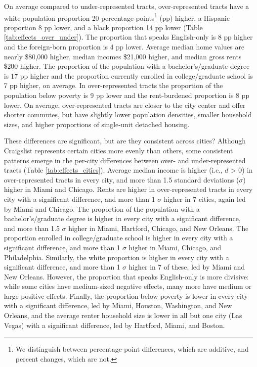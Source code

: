 \documentclass[11pt,letterpaper]{article}
\begin{document}
On average compared to under-represented tracts, over-represented tracts have a white population proportion 20 percentage-points\footnote{We distinguish between percentage-point differences, which are additive, and percent changes, which are not.} (pp) higher, a Hispanic proportion 8 pp lower, and a black proportion 14 pp lower (Table \ref{tab:effects_over_under}). The proportion that speaks English-only is 8 pp higher and the foreign-born proportion is 4 pp lower. Average median home values are nearly \$80,000 higher, median incomes \$21,000 higher, and median gross rents \$200 higher. The proportion of the population with a bachelor's/graduate degree is 17 pp higher and the proportion currently enrolled in college/graduate school is 7 pp higher, on average. In over-represented tracts the proportion of the population below poverty is 9 pp lower and the rent-burdened proportion is 8 pp lower. On average, over-represented tracts are closer to the city center and offer shorter commutes, but have slightly lower population densities, smaller household sizes, and higher proportions of single-unit detached housing.

These differences are significant, but are they consistent across cities? Although Craigslist represents certain cities more evenly than others, some consistent patterns emerge in the per-city differences between over- and under-represented tracts (Table \ref{tab:effects_cities}). Average median income is higher (i.e., $d$ > 0) in over-represented tracts in every city, and more than 1.5 standard deviations ($\sigma$) higher in Miami and Chicago. Rents are higher in over-represented tracts in every city with a significant difference, and more than 1 $\sigma$ higher in 7 cities, again led by Miami and Chicago. The proportion of the population with a bachelor's/graduate degree is higher in every city with a significant difference, and more than 1.5 $\sigma$ higher in Miami, Hartford, Chicago, and New Orleans. The proportion enrolled in college/graduate school is higher in every city with a significant difference, and more than 1 $\sigma$ higher in Miami, Chicago, and Philadelphia. Similarly, the white proportion is higher in every city with a significant difference, and more than 1 $\sigma$ higher in 7 of these, led by Miami and New Orleans. However, the proportion that speaks English-only is more divisive: while some cities have medium-sized negative effects, many more have medium or large positive effects. Finally, the proportion below poverty is lower in every city with a significant difference, led by Miami, Houston, Washington, and New Orleans, and the average renter household size is lower in all but one city (Las Vegas) with a significant difference, led by Hartford, Miami, and Boston.
\end{document}
